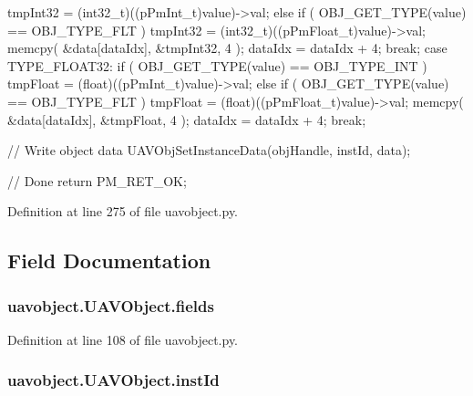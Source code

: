 \begin{DoxyVerb}
{{{{                        tmpInt32 = (int32_t)((pPmInt_t)value)->val;
                }
                else if ( OBJ_GET_TYPE(value) == OBJ_TYPE_FLT )  
                {
                    tmpInt32 = (int32_t)((pPmFloat_t)value)->val;  
                }                                               
                memcpy( &data[dataIdx], &tmpInt32, 4 );
                dataIdx = dataIdx + 4;
                break;  
        case TYPE_FLOAT32:
                if ( OBJ_GET_TYPE(value) == OBJ_TYPE_INT )  
                {
                        tmpFloat = (float)((pPmInt_t)value)->val;
                }
                else if ( OBJ_GET_TYPE(value) == OBJ_TYPE_FLT )  
                {
                    tmpFloat = (float)((pPmFloat_t)value)->val;  
                }                                               
                memcpy( &data[dataIdx], &tmpFloat, 4 );
                dataIdx = dataIdx + 4;
                break;    
}
        }
}

// Write object data
UAVObjSetInstanceData(objHandle, instId, data);

// Done
return PM_RET_OK;
\end{DoxyVerb}
 

Definition at line 275 of file uavobject.\-py.



\subsection{Field Documentation}
\hypertarget{classuavobject_1_1_u_a_v_object_af9ce81de37f806ae8b2b50bfa9e6c72b}{
\subsubsection[{fields}]{\setlength{\rightskip}{0pt plus 5cm}uavobject.\-U\-A\-V\-Object.\-fields}}\label{classuavobject_1_1_u_a_v_object_af9ce81de37f806ae8b2b50bfa9e6c72b}


Definition at line 108 of file uavobject.\-py.

\hypertarget{classuavobject_1_1_u_a_v_object_afb8864f141f2aca9fefa152fd64aeebe}{
\subsubsection[{inst\-Id}]{\setlength{\rightskip}{0pt plus 5cm}uavobject.\-U\-A\-V\-Object.\-inst\-Id}}\label{classuavobject_1_1_u_a_v_object_afb8864f141f2aca9fefa152fd64aeebe}


